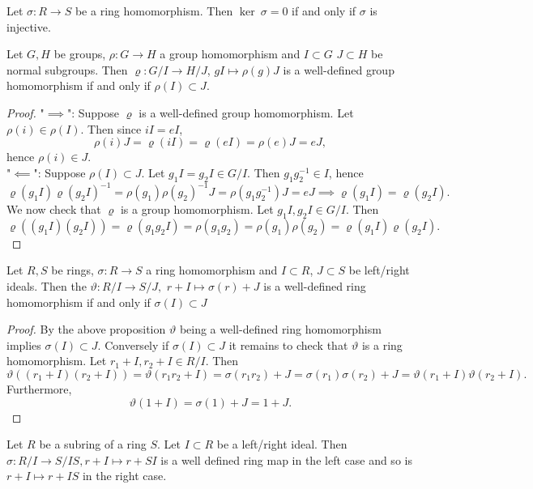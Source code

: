 \begin{corollary}
    Let $\sigma : R \rightarrow S$ be a ring homomorphism. Then $\ker \ \sigma = 0$ if and only if $\sigma$ is injective.
\end{corollary}
\begin{lemma}\label{WellDefinednessOfQuotientGroupMaps}
    Let $G,H$ be groups, $\rho : G \rightarrow H$ a group homomorphism and $I\subset G$ $J\subset H$ be normal subgroups. Then $\varrho : G/I \rightarrow H/J$, $gI \mapsto \rho(g)J$ is a well-defined group homomorphism if and only if $\rho(I)\subset J$. 
\end{lemma}
\begin{proof}
    "$\implies$": Suppose $\varrho$ is a well-defined group homomorphism. Let $\rho(i)\in \rho(I)$. Then since $iI = eI$, 
    $$\rho(i)J =\varrho(iI) = \varrho(eI)=\rho(e)J = eJ,$$
    hence $\rho(i)\in J$.\\
    "$\impliedby$": Suppose $\rho(I)\subset J$. Let $g_1I=g_2I\in G/I$. Then $g_1g_2^{-1}\in I$, hence 
    $$\varrho(g_1I)\varrho(g_2I)^{-1} = \rho(g_1)\rho(g_2)^{-1}J = \rho\left(g_1g_2^{-1}\right)J = eJ \implies \varrho(g_1I)=\varrho(g_2I).$$
    We now check that $\varrho$ is a group homomorphism. Let $g_1I,g_2I\in G/I$. Then 
    $$\varrho((g_1I)(g_2I)) = \varrho(g_1g_2I)=\rho(g_1g_2)=\rho(g_1)\rho(g_2) = \varrho(g_1I)\varrho(g_2I).$$
\end{proof}
\begin{corollary}\label{WellDefinedQuotientRingHomFromRingHom}
    Let $R,S$ be rings, $\sigma : R \rightarrow S$ a ring homomorphism and $I\subset R$, $J\subset S$ be left/right ideals. Then the $\vartheta : R/I \rightarrow S/J,$ $r+I \mapsto \sigma(r)+J$ is a well-defined ring homomorphism if and only if $\sigma(I)\subset J$
\end{corollary}
\begin{proof}
    By the above proposition $\vartheta$ being a well-defined ring homomorphism implies $\sigma(I)\subset J$. Conversely if $\sigma(I)\subset J$ it remains to check that $\vartheta$ is a ring homomorphism. Let $r_1+I,r_2+I\in R/I$. Then 
    $$\vartheta((r_1+I)(r_2+I)) = \vartheta(r_1r_2+I)=\sigma(r_1r_2)+ J= \sigma(r_1)\sigma(r_2) +J= \vartheta(r_1+I)\vartheta(r_2+I).$$
    Furthermore, 
    $$\vartheta(1+I) = \sigma(1) + J = 1 + J.$$
\end{proof}
\begin{corollary}
    Let $R$ be a subring of a ring $S$. Let $I\subset R$ be a left/right ideal. Then $\sigma : R/I \rightarrow S/IS, r+I \mapsto r+SI$ is a well defined ring map in the left case and so is $r+ I \mapsto r+IS$ in the right case.
\end{corollary}
